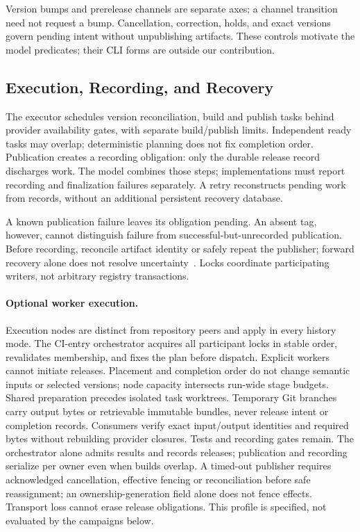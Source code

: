 Version bumps and prerelease channels are separate axes; a channel transition
need not request a bump. Cancellation, correction, holds, and exact versions
govern pending intent without unpublishing artifacts. These controls motivate
the model predicates; their CLI forms are outside our contribution.

\subsection{Execution, Recording, and Recovery}
The executor schedules version reconciliation, build and publish tasks behind
provider availability gates, with separate build/publish limits. Independent
ready tasks may overlap; deterministic planning does not fix completion order.
Publication creates a recording obligation: only the durable release record
discharges work. The model combines those steps; implementations must report
recording and finalization failures separately. A retry reconstructs pending
work from records, without an additional persistent recovery database.

A known publication failure leaves its obligation pending. An absent tag,
however, cannot distinguish failure from successful-but-unrecorded publication.
Before recording, reconcile artifact identity or safely repeat the publisher;
forward recovery alone does not resolve uncertainty~\cite{helland12}.
Locks coordinate participating writers, not arbitrary registry transactions.

\paragraph{Optional worker execution.}
Execution nodes are distinct from repository peers and apply in every history
mode. The CI-entry orchestrator acquires all participant locks in stable order,
revalidates membership, and fixes the plan before dispatch. Explicit workers
cannot initiate releases. Placement and completion order do not change semantic
inputs or selected versions; node capacity intersects run-wide stage budgets.
Shared preparation precedes isolated task worktrees. Temporary Git branches
carry output bytes or retrievable immutable bundles, never release intent or
completion records. Consumers verify exact input/output identities and required
bytes without rebuilding provider closures. Tests and recording gates remain.
The orchestrator alone admits results and records releases; publication and
recording serialize per owner even when builds overlap. A timed-out publisher
requires acknowledged cancellation, effective fencing or reconciliation before
safe reassignment; an ownership-generation field alone does not fence effects.
Transport loss cannot erase release obligations. This profile is specified,
not evaluated by the campaigns below.

